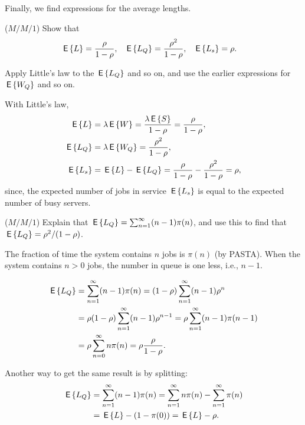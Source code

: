 Finally, we find expressions for  the average lengths.
\begin{exercise}($M/M/1$)
  Show that
  \begin{align*}
\,\mathsf{E}\left\{L\right\} &= \frac\rho{1-\rho}, & \,\mathsf{E}\left\{L_Q\right\} &= \frac{\rho^2}{1-\rho}, & \,\mathsf{E}\left\{L_s\right\} &= \rho.
  \end{align*}
  \begin{hint}
    Apply Little's law to the $\,\mathsf{E}\left\{L_Q\right\}$ and so on, and use the earlier expressions for $\,\mathsf{E}\left\{W_Q\right\}$ and so on.
  \end{hint}
  \begin{solution}
With Little's law, 
\begin{equation*}
  \begin{split}
\,\mathsf{E}\left\{L\right\} &= \lambda \,\mathsf{E}\left\{W\right\} = \frac{\lambda \,\mathsf{E}\left\{S\right\}}{1-\rho} = \frac\rho{1-\rho}, \\
  \,\mathsf{E}\left\{L_Q\right\} &= \lambda \,\mathsf{E}\left\{W_Q\right\} = \frac{\rho^2}{1-\rho}, \\
  \,\mathsf{E}\left\{L_s\right\} &= \,\mathsf{E}\left\{L\right\} - \,\mathsf{E}\left\{L_Q\right\} = \frac{\rho}{1-\rho} - \frac{\rho^2}{1-\rho} = \rho, 
      \end{split}
\end{equation*}
since, the expected number of jobs in service $\,\mathsf{E}\left\{L_s\right\}$ is
equal to the expected number of busy servers.
  \end{solution}
\end{exercise}

\begin{exercise}($M/M/1$) Explain that
$\,\mathsf{E}\left\{L_Q\right\} = \sum_{n=1}^\infty (n-1)\pi(n)$, and  use this to find that $\,\mathsf{E}\left\{L_Q\right\}=\rho^2/(1-\rho)$.
  \begin{solution}
    The fraction of time the system contains $n$ jobs is $\pi(n)$ (by
    PASTA). When the system contains $n>0$ jobs, the number in queue
    is one less, i.e., $n-1$.

    \begin{equation*}
      \begin{split}
\,\mathsf{E}\left\{L_Q\right\} 
&= \sum_{n=1}^\infty (n-1)\pi(n) 
= (1-\rho)\sum_{n=1}^\infty (n-1) \rho^n\\
&= \rho (1-\rho)\sum_{n=1}^\infty (n-1) \rho^{n-1}
= \rho \sum_{n=1}^\infty (n-1) \pi(n-1)\\
&= \rho \sum_{n=0}^\infty n \pi(n)
= \rho \frac{\rho}{1-\rho}.
      \end{split}
    \end{equation*}

Another way to get the same result is by splitting: 
\begin{equation*}
  \begin{split}
\,\mathsf{E}\left\{L_Q\right\} 
&= \sum_{n=1}^\infty (n-1)\pi(n) 
=\sum_{n=1}^\infty n\pi(n) -\sum_{n=1}^\infty \pi(n)\\
&= \,\mathsf{E}\left\{L\right\} - (1-\pi(0)) = \,\mathsf{E}\left\{L\right\} - \rho.
  \end{split}
\end{equation*}
  \end{solution}
\end{exercise}

